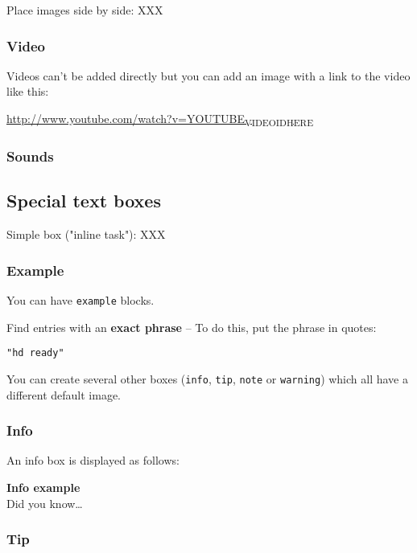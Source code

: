 \documentclass[11pt]{article}
\begin{document}
Place images side by side: XXX

\subsubsection*{Video}
\label{sec:org0026f1a}

Videos can't be added directly but you can add an image with a link to the video like this:

\href{http://img.youtube.com/vi/YOUTUBE\_VIDEO\_ID\_HERE/0.jpg}{http://www.youtube.com/watch?v=YOUTUBE\textsubscript{VIDEO}\textsubscript{ID}\textsubscript{HERE}}

\subsubsection*{Sounds}
\label{sec:orgf6ec72c}

\subsection*{Special text boxes}
\label{sec:orga064f10}

Simple box ("inline task"): XXX

\subsubsection*{Example}
\label{sec:orgc3a76df}

You can have \texttt{example} blocks.

Find entries with an \textbf{exact phrase} -- To do this, put the phrase in quotes:

\begin{verbatim}
"hd ready"
\end{verbatim}


You can create several other boxes (\texttt{info}, \texttt{tip}, \texttt{note} or \texttt{warning}) which all have
a different default image.

\subsubsection*{Info}
\label{sec:org9d7d3a2}

An info box is displayed as follows:

\begin{info}
\textbf{Info example} \\[0pt]
Did you know\ldots{}
\end{info}

\subsubsection*{Tip}
\label{sec:org52bb001}
\end{document}
